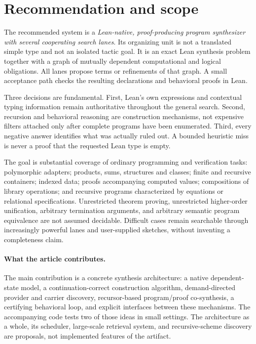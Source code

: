 \section{Recommendation and scope}
\label{sec:recommendation}

The recommended system is a \emph{Lean-native, proof-producing program synthesizer with several cooperating search lanes}. Its organizing unit is not a translated simple type and not an isolated tactic goal. It is an exact Lean synthesis problem together with a graph of mutually dependent computational and logical obligations. All lanes propose terms or refinements of that graph. A small acceptance path checks the resulting declarations and behavioral proofs in Lean.

Three decisions are fundamental. First, Lean's own expressions and contextual typing information remain authoritative throughout the general search. Second, recursion and behavioral reasoning are construction mechanisms, not expensive filters attached only after complete programs have been enumerated. Third, every negative answer identifies what was actually ruled out. A bounded heuristic miss is never a proof that the requested Lean type is empty.

The goal is substantial coverage of ordinary programming and verification tasks: polymorphic adapters; products, sums, structures and classes; finite and recursive containers; indexed data; proofs accompanying computed values; compositions of library operations; and recursive programs characterized by equations or relational specifications. Unrestricted theorem proving, unrestricted higher-order unification, arbitrary termination arguments, and arbitrary semantic program equivalence are not assumed decidable. Difficult cases remain searchable through increasingly powerful lanes and user-supplied sketches, without inventing a completeness claim.

\paragraph{What the article contributes.}
The main contribution is a concrete synthesis architecture: a native dependent-state model, a continuation-correct construction algorithm, demand-directed provider and carrier discovery, recursor-based program/proof co-synthesis, a certifying behavioral loop, and explicit interfaces between these mechanisms. The accompanying code tests two of those ideas in small settings. The architecture as a whole, its scheduler, large-scale retrieval system, and recursive-scheme discovery are proposals, not implemented features of the artifact.

